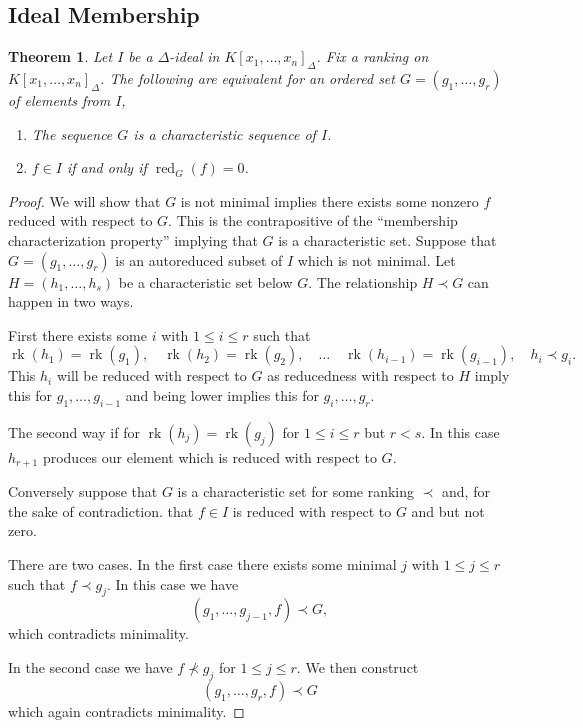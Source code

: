 \documentclass[12pt]{book}
\numberwithin{equation}{section}
\newtheorem{theorem}{Theorem}[subsection]
\theoremstyle{definition}
\theoremstyle{remark}
\newcommand{\red}{\operatorname{red}}
\newcommand{\rk}{\operatorname{rk}}
\begin{document}
\subsection{Ideal Membership}

\begin{theorem}
	Let $I$ be a $\Delta$-ideal in $K[x_1,\ldots,x_n]_{\Delta}$. 
	Fix a ranking on $K[x_1,\ldots,x_n]_{\Delta}$.
	The following are equivalent for an ordered set $G=(g_1,\ldots,g_r)$ of elements from $I$,
	\begin{enumerate}[topsep=0pt]
		\item The sequence $G$ is a characteristic sequence of $I$.
		\item $f \in I$ if and only if $\red_G(f)=0$. 
	\end{enumerate}
\end{theorem}
\begin{proof}
	We will show that $G$ is not minimal implies there exists some nonzero $f$ reduced with respect to $G$.
	This is the contrapositive of the ``membership characterization property'' implying that $G$ is a characteristic set.
	Suppose that $G=(g_1,\ldots,g_r)$ is an autoreduced subset of $I$ which is not minimal.
	Let $H=(h_1,\ldots,h_s)$ be a characteristic set below $G$. 
	The relationship $H\prec G$ can happen in two ways.
	
	First there exists some $i$ with $1\leq i \leq r$ such that 
	$$\rk(h_1)= \rk(g_1), \quad\rk(h_2)=\rk(g_2), \quad \ldots \quad \rk(h_{i-1})=\rk(g_{i-1}), \quad h_i \prec g_i. $$
	This $h_i$ will be reduced with respect to $G$ as reducedness with respect to $H$ imply this for $g_1,\ldots,g_{i-1}$ and being lower implies this for $g_i,\ldots,g_r$.
	
	The second way if for $\rk(h_j) = \rk(g_j)$ for $1\leq i \leq r$ but $r<s$. 
	In this case $h_{r+1}$ produces our element which is reduced with respect to $G$.
	
	Conversely suppose that $G$ is a characteristic set for some ranking $\prec$ and, for the sake of contradiction. that $f\in I$ is reduced with respect to $G$ and but not zero.
	
	There are two cases.
	In the first case there exists some minimal $j$ with $1\leq j \leq r$ such that $f\prec g_j$.
	In this case we have  
	 $$ (g_1,\ldots,g_{j-1},f) \prec G, $$
	which contradicts minimality.
	 
	In the second case we have $f \nprec g_j$ for $1\leq j \leq r$. 
	We then construct 
	 $$ (g_1,\ldots, g_r,f) \prec G $$
	which again contradicts minimality.
\end{proof}
\end{document}
